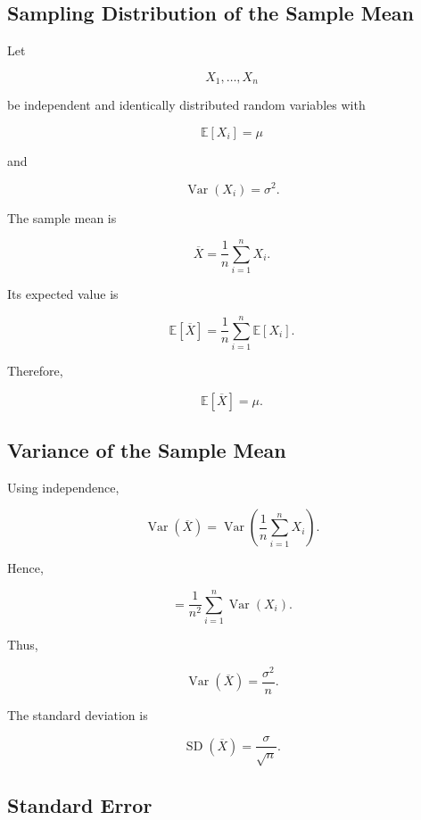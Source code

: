 \subsection{Sampling Distribution of the Sample Mean}
\label{subsec:sampling-distribution-sample-mean}

Let

\[
X_1,\ldots,X_n
\]

be independent and identically distributed random variables with

\[
\mathbb{E}[X_i]=\mu
\]

and

\[
\operatorname{Var}(X_i)=\sigma^2.
\]

The sample mean is

\[
\boxed{
\overline{X}
=
\frac1n
\sum_{i=1}^{n}X_i.
}
\]

Its expected value is

\[
\mathbb{E}[\overline{X}]
=
\frac1n
\sum_{i=1}^{n}
\mathbb{E}[X_i].
\]

Therefore,

\[
\boxed{
\mathbb{E}[\overline{X}]
=
\mu.
}
\]

\subsection{Variance of the Sample Mean}
\label{subsec:variance-sample-mean}

Using independence,

\[
\operatorname{Var}(\overline{X})
=
\operatorname{Var}
\left(
\frac1n
\sum_{i=1}^{n}X_i
\right).
\]

Hence,

\[
=
\frac1{n^2}
\sum_{i=1}^{n}
\operatorname{Var}(X_i).
\]

Thus,

\[
\boxed{
\operatorname{Var}(\overline{X})
=
\frac{\sigma^2}{n}.
}
\]

The standard deviation is

\[
\boxed{
\operatorname{SD}(\overline{X})
=
\frac{\sigma}{\sqrt{n}}.
}
\]

\subsection{Standard Error}
\label{subsec:standard-error}

